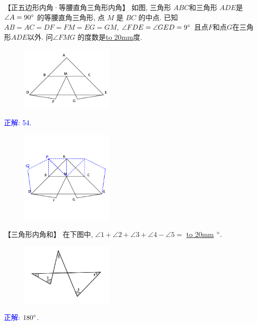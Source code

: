 \item {
    【正五边形内角·等腰直角三角形内角】
    如图, 三角形 $ABC$和三角形 $ADE$是 $\angle A=90\degree$ 的等腰直角三角形, 点 $M$ 是 $BC$ 的中点. 已知$AB=AC=DF=FM=EG=GM$, $\angle FDE = \angle GED=9\degree$ 且点$F$和点$G$在三角形$ADE$以外. 问$\angle FMG$ 的度数是\underline{\hbox to 20mm{}}度. 
    \begin{figure}[H] 
        \centering
        \includegraphics[width=0.4\textwidth]{./pics/Chapter_2/8.png}
    \end{figure}
    \ifshowSolution 
        \fangsong{}\textcolor{blue}{
            正解: 54.\\
            \begin{figure}[H] 
                \centering
                \includegraphics[width=0.4\textwidth]{./pics/Chapter_2/seikai_8.png}
            \end{figure}
        }
    \else
        \vspace{1cm}
    \fi
}

\item {
    【三角形内角和】
    {在下图中, $\angle 1 + \angle 2 + \angle 3 + \angle 4 - \angle 5=$ \underline{\hbox to 20mm{}} $\degree$.} 
    \begin{figure}[H] 
        \centering
        \includegraphics[width=0.4\textwidth]{./pics/Chapter_2/9.png}
    \end{figure}
    \ifshowSolution 
        \fangsong{}\textcolor{blue}{
            正解: $180\degree$. \\
        }
    \else
        \vspace{1cm}
    \fi
}

